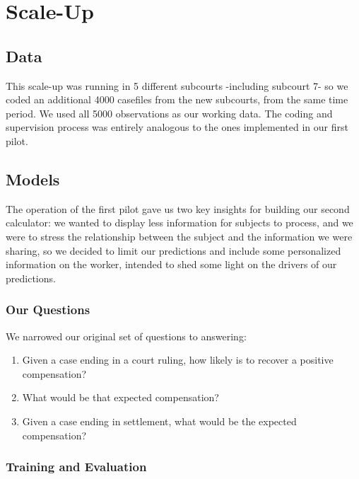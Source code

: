 \documentclass[]{article}
\begin{document}
\section{Scale-Up}\label{scale-up}

\subsection{Data}\label{data-1}

This scale-up was running in 5 different subcourts -including subcourt
7- so we coded an additional 4000 casefiles from the new subcourts, from
the same time period. We used all 5000 observations as our working data.
The coding and supervision process was entirely analogous to the ones
implemented in our first pilot.

\subsection{Models}\label{models-1}

The operation of the first pilot gave us two key insights for building
our second calculator: we wanted to display less information for
subjects to process, and we were to stress the relationship between the
subject and the information we were sharing, so we decided to limit our
predictions and include some personalized information on the worker,
intended to shed some light on the drivers of our predictions.

\subsubsection{Our Questions}\label{our-questions-1}

We narrowed our original set of questions to answering:

\begin{enumerate}
\def\labelenumi{\arabic{enumi}.}
\item
  Given a case ending in a court ruling, how likely is to recover a
  positive compensation?
\item
  What would be that expected compensation?
\item
  Given a case ending in settlement, what would be the expected
  compensation?
\end{enumerate}

\subsubsection{Training and Evaluation}\label{training-and-evaluation-1}
\end{document}
